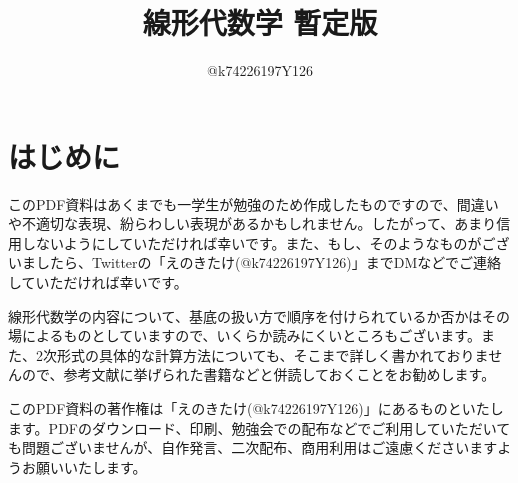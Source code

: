 \documentclass[10pt,a4paper,titlepage]{jsarticle}
\title{線形代数学 暫定版}
\author{@k74226197Y126}
\begin{document}
\maketitle
{}
\section*{はじめに}
このPDF資料はあくまでも一学生が勉強のため作成したものですので、間違いや不適切な表現、紛らわしい表現があるかもしれません。したがって、あまり信用しないようにしていただければ幸いです。また、もし、そのようなものがございましたら、Twitterの「えのきたけ(@k74226197Y126)」までDMなどでご連絡していただければ幸いです。\par
線形代数学の内容について、基底の扱い方で順序を付けられているか否かはその場によるものとしていますので、いくらか読みにくいところもございます。また、2次形式の具体的な計算方法についても、そこまで詳しく書かれておりませんので、参考文献に挙げられた書籍などと併読しておくことをお勧めします。\par
このPDF資料の著作権は「えのきたけ(@k74226197Y126)」にあるものといたします。PDFのダウンロード、印刷、勉強会での配布などでご利用していただいても問題ございませんが、自作発言、二次配布、商用利用はご遠慮くださいますようお願いいたします。
\tableofcontents
\clearpage
{}


\clearpage

\clearpage

\clearpage

\clearpage

\clearpage

\clearpage

\clearpage

\clearpage

\clearpage

\clearpage

\clearpage


\clearpage

\clearpage

\clearpage

\clearpage

\clearpage

\clearpage

\clearpage

\clearpage


\clearpage

\clearpage

\clearpage

\clearpage

\clearpage

\clearpage

\clearpage

\clearpage

\clearpage

\clearpage

\clearpage


\clearpage

\clearpage

\clearpage

\clearpage

\clearpage

\clearpage

\clearpage

\clearpage

%
\end{document}
